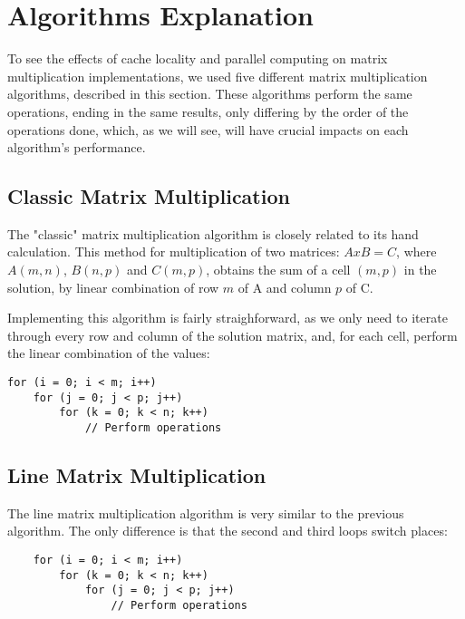 \section{Algorithms Explanation} \label{section:algorithms}

To see the effects of cache locality and parallel computing on matrix multiplication implementations, we used five different matrix multiplication algorithms, described in this section. These algorithms perform the same operations, ending in the same results, only differing by the order of the operations done, which, as we will see, will have crucial impacts on each algorithm's performance.

\subsection{Classic Matrix Multiplication}

The "classic" matrix multiplication algorithm is closely related to its hand calculation. This method for multiplication of two matrices: $A x B = C$, where $A(m, n)$, $B(n, p)$ and $C(m, p)$, obtains the sum of a cell $(m,p)$ in the solution, by linear combination of row $m$ of A and column $p$ of C.

Implementing this algorithm is fairly straighforward, as we only need to iterate through every row and column of the solution matrix, and, for each cell, perform the linear combination of the values:

\begin{verbatim}
for (i = 0; i < m; i++)
    for (j = 0; j < p; j++)
        for (k = 0; k < n; k++)
            // Perform operations
\end{verbatim}

    
\subsection{Line Matrix Multiplication}

The line matrix multiplication algorithm is very similar to the previous algorithm. The only difference is that the second and third loops switch places:

\begin{verbatim}
    for (i = 0; i < m; i++)
        for (k = 0; k < n; k++)
            for (j = 0; j < p; j++)
                // Perform operations
\end{verbatim}

